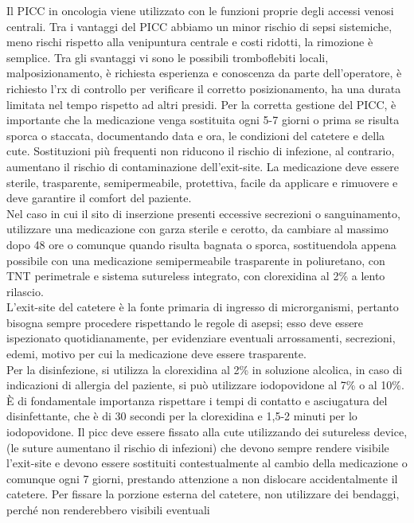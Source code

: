 Il PICC in oncologia viene utilizzato con le funzioni proprie degli accessi venosi centrali. 
Tra i vantaggi del PICC abbiamo un minor rischio di sepsi sistemiche, meno rischi rispetto alla venipuntura 
centrale e costi ridotti, la rimozione è semplice. Tra gli svantaggi vi sono le possibili tromboflebiti locali, 
malposizionamento, è richiesta esperienza e conoscenza da parte dell’operatore, è richiesto l’rx di controllo per 
verificare il corretto posizionamento, ha una durata limitata nel tempo rispetto ad altri presidi. %
Per la corretta gestione del PICC, è importante che la medicazione venga sostituita ogni 5-7 giorni o prima se risulta
sporca o staccata, documentando data e ora, le condizioni del catetere e della cute. Sostituzioni più frequenti non 
riducono il rischio di infezione, al contrario, aumentano il rischio di contaminazione dell’exit-site. La medicazione 
deve essere sterile, trasparente, semipermeabile, protettiva, facile da applicare e rimuovere e deve garantire 
il comfort del paziente\cite{AIOMCVC}.\\
Nel caso in cui il sito di inserzione presenti eccessive secrezioni o sanguinamento, utilizzare una medicazione con 
garza sterile e cerotto, da cambiare al massimo dopo 48 ore o comunque quando risulta bagnata o sporca, sostituendola 
appena possibile con una medicazione semipermeabile trasparente in poliuretano, con TNT perimetrale e sistema 
sutureless integrato, con clorexidina al 2\% a lento rilascio.\\ 
L’exit-site del catetere è la fonte primaria di ingresso di microrganismi, pertanto bisogna sempre procedere 
rispettando le regole di asepsi; esso deve essere ispezionato quotidianamente, per evidenziare eventuali arrossamenti, 
secrezioni, edemi, motivo per cui la medicazione deve essere trasparente\cite{AIOMCVC}.\\
Per la disinfezione, si utilizza la clorexidina al 2\% in soluzione alcolica, in caso di indicazioni di allergia del 
paziente, si può utilizzare iodopovidone al 7\% o al 10\%. È di fondamentale importanza rispettare i tempi di
contatto e asciugatura del disinfettante, che è di 30 secondi per la clorexidina e 1,5-2 minuti per lo iodopovidone.
Il picc deve essere fissato alla cute utilizzando dei sutureless device, (le suture aumentano il rischio di infezioni) 
che devono sempre rendere visibile l’exit-site e devono essere sostituiti contestualmente al cambio della medicazione 
o comunque ogni 7 giorni, prestando attenzione a non dislocare accidentalmente il catetere. 
Per fissare la porzione esterna del catetere, non utilizzare dei bendaggi, perché non renderebbero visibili eventuali 
